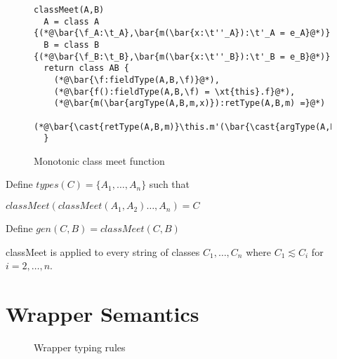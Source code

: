 \documentclass{sigplanconf}
\begin{document}
\begin{figure}
\begin{lstlisting}
classMeet(A,B)
  A = class A {(*@\bar{\f_A:\t_A},\bar{m(\bar{x:\t''_A}):\t'_A = e_A}@*)}
  B = class B {(*@\bar{\f_B:\t_B},\bar{m(\bar{x:\t''_B}):\t'_B = e_B}@*)}
  return class AB {
    (*@\bar{\f:fieldType(A,B,\f)}@*),
    (*@\bar{f():fieldType(A,B,\f) = \xt{this}.f}@*),
    (*@\bar{m(\bar{argType(A,B,m,x)}):retType(A,B,m) =}@*)
    	(*@\bar{\cast{retType(A,B,m)}\this.m'(\bar{\cast{argType(A,B,m,x)}x})}@*)
  }
\end{lstlisting}
\caption{Monotonic class meet function}
\end{figure}

Define $types(C) = \{A_1,\ldots,A_n\}$ such that 

$classMeet(classMeet(A_1,A_2)\ldots,A_n) = C$

Define $gen(C, B) = classMeet(C,B)$

classMeet is applied to every string of classes $C_1,\ldots,C_n$ where $C_1 \lesssim C_i$ for $i=2,\ldots,n$.

\section{Wrapper Semantics}


\begin{figure}
\begin{mathpar}




\end{mathpar}
\caption{Wrapper typing rules}
\end{figure}
\end{document}

